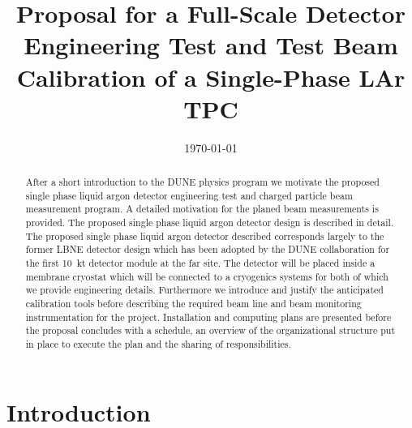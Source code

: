 \documentclass[12pt]{article}
\begin{document}
\linenumbers

\title{  Proposal for a Full-Scale Detector Engineering Test and Test Beam Calibration of a Single-Phase LAr TPC}

\date{\today}
	
%	

\maketitle




\begin{abstract}

After a short introduction to the DUNE physics program we motivate the proposed single phase liquid argon detector engineering test and charged particle beam measurement program. A detailed motivation for the planed beam measurements is provided. The proposed
single phase liquid argon detector design is described in detail. 
The proposed single phase liquid argon detector described corresponds largely to the former LBNE detector design which has been adopted by the DUNE collaboration for the first 10~kt detector module at the far site.
The detector will be placed inside a membrane cryostat which will be connected to a cryogenics systems for both of which we provide engineering details. 
Furthermore we introduce and justify the anticipated calibration tools before 
describing the required beam line and beam monitoring instrumentation for the project.
Installation and computing plans are presented before
the proposal concludes with a schedule, an overview of the organizational structure put in place to execute the plan and 
the sharing of responsibilities.


\end{abstract}

\newpage
\tableofcontents

\newpage

\section{Introduction}
	
%	
\end{document}
